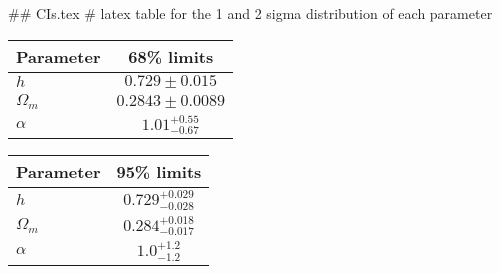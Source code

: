 ## CIs.tex
# latex table for the 1 and 2 sigma distribution of each parameter

\begin{tabular} { l  c}
 Parameter &  68\% limits\\
\hline
{\boldmath$h              $} & $0.729\pm 0.015            $\\
{\boldmath$\Omega_m       $} & $0.2843\pm 0.0089          $\\
{\boldmath$\alpha         $} & $1.01^{+0.55}_{-0.67}      $\\
\hline
\end{tabular}

\begin{tabular} { l  c}
 Parameter &  95\% limits\\
\hline
{\boldmath$h              $} & $0.729^{+0.029}_{-0.028}   $\\
{\boldmath$\Omega_m       $} & $0.284^{+0.018}_{-0.017}   $\\
{\boldmath$\alpha         $} & $1.0^{+1.2}_{-1.2}         $\\
\hline
\end{tabular}
